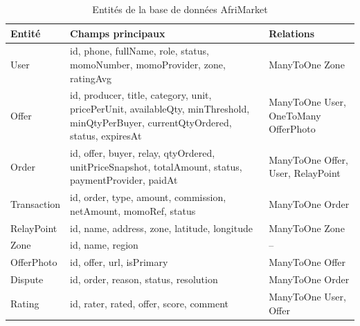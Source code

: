 \documentclass[12pt, a4paper, oneside]{report}
\begin{document}
\begin{table}[H]
  \centering
  \caption{Entités de la base de données AfriMarket}
  \label{tab:entities}
  \begin{tabularx}{\textwidth}{|l|X|l|}
    \hline
    \textbf{Entité} & \textbf{Champs principaux} & \textbf{Relations} \\
    \hline
    User & id, phone, fullName, role, status, momoNumber, momoProvider, zone, ratingAvg & ManyToOne Zone \\
    \hline
    Offer & id, producer, title, category, unit, pricePerUnit, availableQty, minThreshold, minQtyPerBuyer, currentQtyOrdered, status, expiresAt & ManyToOne User, OneToMany OfferPhoto \\
    \hline
    Order & id, offer, buyer, relay, qtyOrdered, unitPriceSnapshot, totalAmount, status, paymentProvider, paidAt & ManyToOne Offer, User, RelayPoint \\
    \hline
    Transaction & id, order, type, amount, commission, netAmount, momoRef, status & ManyToOne Order \\
    \hline
    RelayPoint & id, name, address, zone, latitude, longitude & ManyToOne Zone \\
    \hline
    Zone & id, name, region & -- \\
    \hline
    OfferPhoto & id, offer, url, isPrimary & ManyToOne Offer \\
    \hline
    Dispute & id, order, reason, status, resolution & ManyToOne Order \\
    \hline
    Rating & id, rater, rated, offer, score, comment & ManyToOne User, Offer \\
    \hline
  \end{tabularx}
\end{table}

\printbibliography[heading=bibintoc, title={Références bibliographiques}]

\clearpage
{}   %
\renewcommand{\contentsname}{Table des matières}
\tableofcontents
\end{document}
